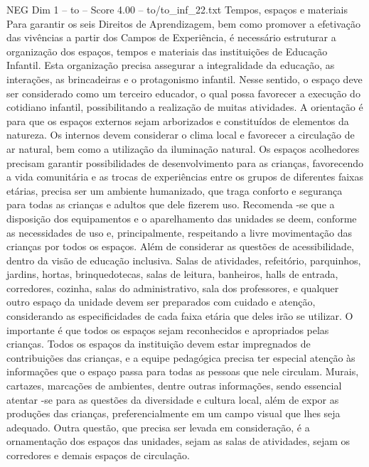 \begin{textsample}{NEG Dim 1 – to – Score 4.00 – to/to\_inf\_22.txt}  \label{ex:f1_neg_040}
Tempos, espaços e materiais Para garantir os seis Direitos de Aprendizagem, bem como promover a efetivação das vivências a partir dos Campos de Experiência, é necessário estruturar a organização dos espaços, tempos e materiais das instituições de Educação Infantil.
Esta organização precisa assegurar a integralidade da educação, as interações, as brincadeiras e o protagonismo infantil.
Nesse sentido, o espaço deve ser considerado como um terceiro educador, o qual possa favorecer a execução do cotidiano infantil, possibilitando a realização de muitas atividades.
A orientação é para que os espaços externos sejam arborizados e constituídos de elementos da natureza.
Os internos devem considerar o clima local e favorecer a circulação de ar natural, bem como a utilização da iluminação natural.
Os espaços acolhedores precisam garantir possibilidades de desenvolvimento para as crianças, favorecendo a vida comunitária e as trocas de experiências entre os grupos de diferentes faixas etárias, precisa ser um ambiente humanizado, que traga conforto e segurança para todas as crianças e adultos que dele fizerem uso.
Recomenda -se que a disposição dos equipamentos e o aparelhamento das unidades se deem, conforme as necessidades de uso e, principalmente, respeitando a livre movimentação das crianças por todos os espaços.
Além de considerar as questões de acessibilidade, dentro da visão de educação inclusiva.
Salas de atividades, refeitório, parquinhos, jardins, hortas, brinquedotecas, salas de leitura, banheiros, halls de entrada, corredores, cozinha, salas do administrativo, sala dos professores, e qualquer outro espaço da unidade devem ser preparados com cuidado e atenção, considerando as especificidades de cada faixa etária que deles irão se utilizar.
O importante é que todos os espaços sejam reconhecidos e apropriados pelas crianças.
Todos os espaços da instituição devem estar impregnados de contribuições das crianças, e a equipe pedagógica precisa ter especial atenção às informações que o espaço passa para todas as pessoas que nele circulam.
Murais, cartazes, marcações de ambientes, dentre outras informações, sendo essencial atentar -se para as questões da diversidade e cultura local, além de expor as produções das crianças, preferencialmente em um campo visual que lhes seja adequado.
Outra questão, que precisa ser levada em consideração, é a ornamentação dos espaços das unidades, sejam as salas de atividades, sejam os corredores e demais espaços de circulação.

\end{textsample}
